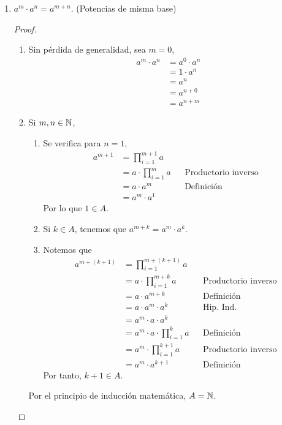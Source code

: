\begin{enumerate}[label=\alph*)]
  \item $a^m \cdot a^n = a^{m+n}$. (Potencias de misma base)
  \begin{proof}\leavevmode
    \begin{enumerate}[label=\Roman*)]
      \item Sin pérdida de generalidad, sea $m=0$,
      \begin{align*}
        a^m \cdot a^n &= a^0 \cdot a^n\\
        &= 1 \cdot a^n\\
        &= a^n\\
        &= a^{n+0}\\
        &= a^{n+m}
      \end{align*}
      \item Si $m,n\in \mathbb{N}$,
      \begin{enumerate}[label=\roman*)]
        \item Se verifica para $n=1$, 
        \begin{align*}
          a^{m+1} &= \prod_{i=1}^{m+1} a\\
          &= a \cdot \prod_{i=1}^{m} a && \text{Productorio inverso}\\
          &= a \cdot a^m && \text{Definición}\\
          &= a^m \cdot a^1
        \end{align*}
        Por lo que $1\in A$.
        \item Si $k\in A$, tenemos que $a^{m+k} = a^m\cdot a^k$.
        \item Notemos que
        \begin{align*}
          a^{m+(k+1)} &= \prod_{i=1}^{m+(k+1)} a\\
          &= a \cdot \prod_{i=1}^{m+k} a && \text{Productorio inverso}\\
          &= a \cdot a^{m+k} && \text{Definición}\\
          &= a\cdot a^m \cdot a^k && \text{Hip. Ind.}\\
          &= a^m \cdot a\cdot a^k\\
          &= a^m \cdot a \cdot \prod_{i=1}^{k} a && \text{Definición}\\
          &= a^m \cdot \prod_{i=1}^{k+1} a && \text{Productorio inverso}\\
          &= a^m \cdot a^{k+1} && \text{Definición}
        \end{align*}
        Por tanto, $k+1\in A$.
      \end{enumerate}
      Por el principio de inducción matemática, $A=\mathbb{N}$.
      \end{enumerate}
  \end{proof}
  

\end{enumerate}
